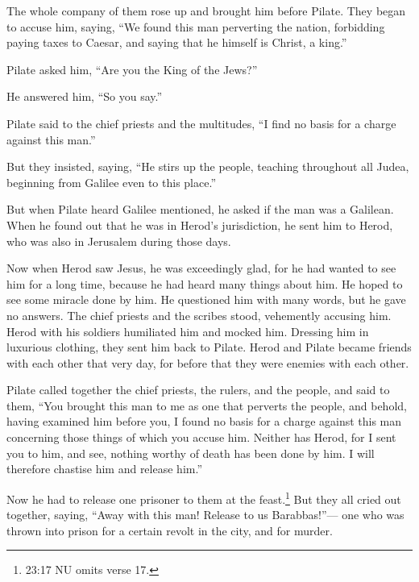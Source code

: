  The whole company of them rose up and brought him before
Pilate.  They began to accuse him, saying, ``We found this
man perverting the nation, forbidding paying taxes to Caesar, and saying
that he himself is Christ, a king.''

 Pilate asked him, ``Are you the King of the Jews?''

He answered him, ``So you say.''

 Pilate said to the chief priests and the multitudes, ``I
find no basis for a charge against this man.''

 But they insisted, saying, ``He stirs up the people,
teaching throughout all Judea, beginning from Galilee even to this
place.''

 But when Pilate heard Galilee mentioned, he asked if the
man was a Galilean.  When he found out that he was in
Herod's jurisdiction, he sent him to Herod, who was also in Jerusalem
during those days.

 Now when Herod saw Jesus, he was exceedingly glad, for he
had wanted to see him for a long time, because he had heard many things
about him. He hoped to see some miracle done by him.  He
questioned him with many words, but he gave no answers. 
The chief priests and the scribes stood, vehemently accusing him.
 Herod with his soldiers humiliated him and mocked him.
Dressing him in luxurious clothing, they sent him back to Pilate.
 Herod and Pilate became friends with each other that very
day, for before that they were enemies with each other.

 Pilate called together the chief priests, the rulers, and
the people,  and said to them, ``You brought this man to me
as one that perverts the people, and behold, having examined him before
you, I found no basis for a charge against this man concerning those
things of which you accuse him.  Neither has Herod, for I
sent you to him, and see, nothing worthy of death has been done by him.
 I will therefore chastise him and release him.''

 Now he had to release one prisoner to them at the
feast.\footnote{23:17 NU omits verse 17.}  But they all
cried out together, saying, ``Away with this man! Release to us
Barabbas!''---  one who was thrown into prison for a
certain revolt in the city, and for murder.


